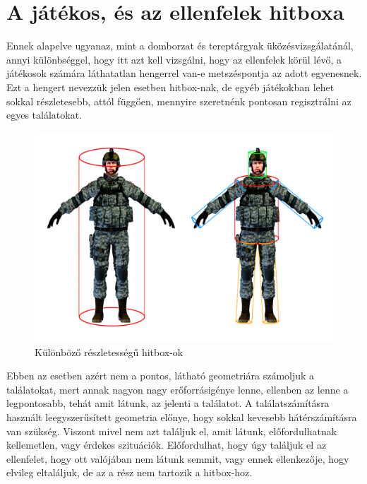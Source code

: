 \section{A játékos, és az ellenfelek hitboxa}


Ennek alapelve ugyanaz, mint a domborzat és tereptárgyak üközésvizsgálatánál, annyi különbséggel, hogy itt azt kell vizsgálni, hogy az ellenfelek körül lévő, a játékosok számára láthatatlan hengerrel van-e metszéspontja az adott egyenesnek. Ezt a hengert nevezzük jelen esetben hitbox-nak, de egyéb játékokban lehet sokkal részletesebb, attól függően, mennyire szeretnénk pontosan regisztrálni az egyes találatokat.

\begin{figure}[h]
\centering
\includegraphics[scale=0.4]{kepek/hitbox.png}
\caption{Különböző részletességű hitbox-ok}
\label{fig:hitbox}
\end{figure}

Ebben az esetben azért nem a pontos, látható geometriára számoljuk a találatokat, mert annak nagyon nagy erőforrásigénye lenne, ellenben az lenne a legpontosabb, tehát amit látunk, az jelenti a találatot. A találatszámításra használt leegyszerűsített geometria előnye, hogy sokkal kevesebb hátérszámításra van szükség. Viszont mivel nem azt találjuk el, amit látunk, előfordulhatnak kellemetlen, vagy érdekes szituációk. Előfordulhat, hogy úgy találjuk el az ellenfelet, hogy ott valójában nem látunk semmit, vagy ennek ellenkezője, hogy elvileg eltaláljuk, de az a rész nem tartozik a hitbox-hoz.

